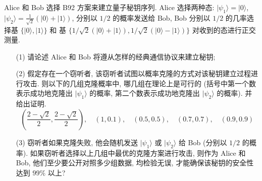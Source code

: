 \documentclass{assignment}
\begin{document}
\begin{prob}
    Alice 和 Bob 选择 B92 方案来建立量子秘钥序列. Alice 选择两种态: $\lvert\psi_1\rangle=\lvert 0\rangle$, $\lvert\psi_2\rangle=\frac{1}{\sqrt{2}}(\lvert 0\rangle+\lvert 1\rangle)$, 分别以 $1/2$ 的概率发送给 Bob, Bob 分别以 $1/2$ 的几率选择基 $\{\lvert 0\rangle,\lvert 1\rangle\}$ 和 基 $\{1/\sqrt{2}(\lvert 0\rangle+\lvert 1\rangle),1/\sqrt{2}(\lvert 0\rangle-\lvert 1\rangle)\}$ 对收到的态进行正交测量.
    \begin{itemize}
        \item[(1)] 请论述 Alice 和 Bob 将遵从怎样的经典通信协议来建立秘钥;
        \item[(2)] 假定存在一个窃听者, 该窃听者试图以概率克隆的方式对该秘钥建立过程进行攻击. 则以下的几组克隆概率中, 哪几组在理论上是可行的 (括号中第一个数表示成功地克隆出 $\lvert\psi_1\rangle$ 的概率, 第二个数表示成功地克隆出 $\lvert\psi_2\rangle$ 的概率). 并给出证明.
        \[
            \left(\frac{2-\sqrt{2}}{2},\frac{2-\sqrt{2}}{2}\right),\quad(1,0.1),\quad(0.5,0.5),\quad(0.7,0.7),\quad(0.9,0.9)
        \]
        \item[(3)] 窃听者如果克隆失败, 他会随机发送 $\lvert\psi_1\rangle$ 或 $\lvert\psi_2\rangle$ 给 Bob (分别以 $1/2$ 的概率). 如果窃听者选择以上几组中最优的克隆方案进行攻击, 则作为 Alice 和 Bob, 他们至少要公开对照多少组数据, 均检验无误, 才能确保该秘钥的安全性达到 $99\%$ 以上?
    \end{itemize}
\end{prob}
\end{document}

